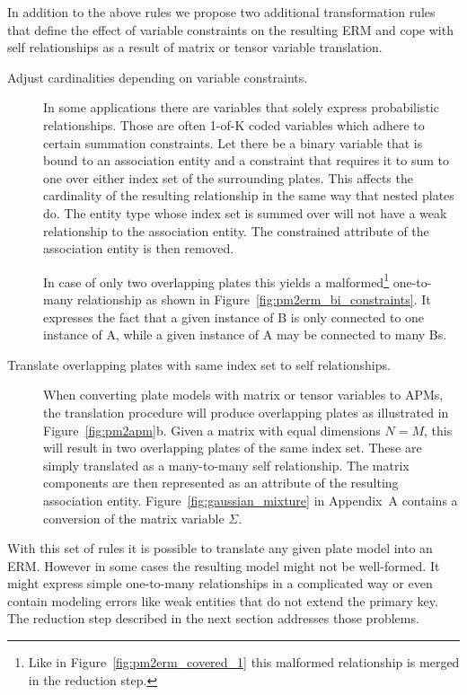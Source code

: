 In addition to the above rules we propose two additional transformation rules that define the effect of variable constraints on the resulting ERM and cope with self relationships as a result of matrix or tensor variable translation.

\begin{description}
\item[Adjust cardinalities depending on variable constraints.] In some applications there are variables that solely express probabilistic relationships. Those are often 1-of-K coded variables which adhere to certain summation constraints. Let there be a binary variable that is bound to an association entity and a constraint that requires it to sum to one over either index set of the surrounding plates. This affects the cardinality of the resulting relationship in the same way that nested plates do. The entity type whose index set is summed over will not have a weak relationship to the association entity. The constrained attribute of the association entity is then removed.

In case of only two overlapping plates this yields a malformed\footnote{Like in Figure~\ref{fig:pm2erm_covered_1} this malformed relationship is merged in the reduction step.} one-to-many relationship as shown in Figure~\ref{fig:pm2erm_bi_constraints}. It expresses the fact that a given instance of B is only connected to one instance of A, while a given instance of A may be connected to many Bs.

\item[Translate overlapping plates with same index set to self relationships.] When converting plate models with matrix or tensor variables to APMs, the translation procedure will produce overlapping plates as illustrated in Figure~\ref{fig:pm2apm}b. Given a matrix with equal dimensions $N = M$, this will result in two overlapping plates of the same index set. These are simply translated as a many-to-many self relationship. The matrix components are then represented as an attribute of the resulting association entity. Figure~\ref{fig:gaussian_mixture} in Appendix~A contains a conversion of the matrix variable $\Sigma$.
\end{description}

With this set of rules it is possible to translate any given plate model into an ERM. However in some cases the resulting model might not be well-formed. It might express simple one-to-many relationships in a complicated way or even contain modeling errors like weak entities that do not extend the primary key. The reduction step described in the next section addresses those problems.

